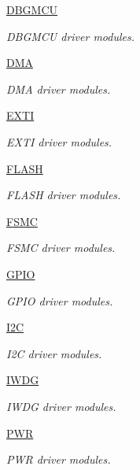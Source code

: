 \begin{DoxyCompactItemize}
\mbox{\hyperlink{group___d_b_g_m_c_u}{D\+B\+G\+M\+CU}}
\begin{DoxyCompactList}\small\item\em D\+B\+G\+M\+CU driver modules. \end{DoxyCompactList}\item 
\mbox{\hyperlink{group___d_m_a}{D\+MA}}
\begin{DoxyCompactList}\small\item\em D\+MA driver modules. \end{DoxyCompactList}\item 
\mbox{\hyperlink{group___e_x_t_i}{E\+X\+TI}}
\begin{DoxyCompactList}\small\item\em E\+X\+TI driver modules. \end{DoxyCompactList}\item 
\mbox{\hyperlink{group___f_l_a_s_h}{F\+L\+A\+SH}}
\begin{DoxyCompactList}\small\item\em F\+L\+A\+SH driver modules. \end{DoxyCompactList}\item 
\mbox{\hyperlink{group___f_s_m_c}{F\+S\+MC}}
\begin{DoxyCompactList}\small\item\em F\+S\+MC driver modules. \end{DoxyCompactList}\item 
\mbox{\hyperlink{group___g_p_i_o}{G\+P\+IO}}
\begin{DoxyCompactList}\small\item\em G\+P\+IO driver modules. \end{DoxyCompactList}\item 
\mbox{\hyperlink{group___i2_c}{I2C}}
\begin{DoxyCompactList}\small\item\em I2C driver modules. \end{DoxyCompactList}\item 
\mbox{\hyperlink{group___i_w_d_g}{I\+W\+DG}}
\begin{DoxyCompactList}\small\item\em I\+W\+DG driver modules. \end{DoxyCompactList}\item 
\mbox{\hyperlink{group___p_w_r}{P\+WR}}
\begin{DoxyCompactList}\small\item\em P\+WR driver modules. \end{DoxyCompactList}\item 

\end{DoxyCompactItemize}
